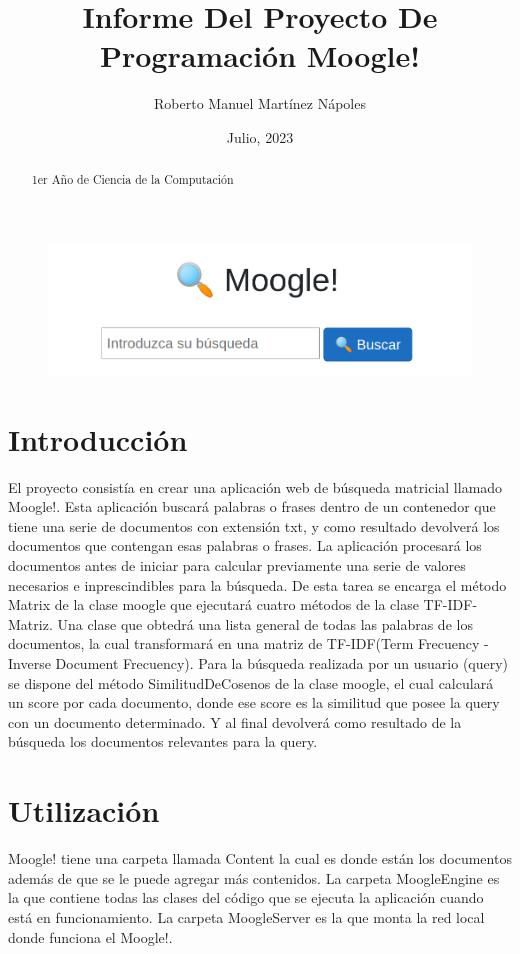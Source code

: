 \documentclass[spanish,10pt,a4paper]{article}
\begin{document}
	\title{Informe Del Proyecto De Programación Moogle!}
	\author{Roberto Manuel Martínez Nápoles}
	\date{Julio, 2023}
	\maketitle
	\begin{abstract}
		\center 
		1er Año de Ciencia de la Computación  
	\end{abstract}
	\begin{figure}[h]
	\center
	\includegraphics[width=12cm]{moogle.png}
	\end{figure}
	
	\newpage
	
	
	\section{Introducción}\label{sec:intro}
	El proyecto consistía en crear una aplicación web de búsqueda matricial llamado Moogle!.  Esta aplicación buscará palabras o frases dentro de un contenedor que tiene una serie de documentos con extensión txt, y como resultado devolverá los documentos que contengan esas palabras o frases. 
	La aplicación  procesará los documentos antes de iniciar para calcular previamente una serie de valores necesarios e inprescindibles para la búsqueda. De esta tarea se encarga el método Matrix  de la clase moogle que ejecutará cuatro métodos de la clase TF-IDF-Matriz. Una clase que obtedrá una lista general de todas las palabras de los documentos, la cual transformará en una matriz de TF-IDF(Term Frecuency - Inverse Document Frecuency).
	Para la búsqueda realizada por un usuario (query) se dispone del método SimilitudDeCosenos de la clase moogle, el cual calculará un score por cada documento, donde ese score es la similitud que posee la query con un documento determinado. Y al final devolverá como resultado de la búsqueda los documentos relevantes para la query.
	
	
	
	\newpage
	\section{Utilización}\label{sec:utilización}
	Moogle! tiene una carpeta llamada Content la cual es donde están los documentos además de que se le puede agregar más contenidos. La carpeta MoogleEngine es la que contiene todas las clases del código que se ejecuta la aplicación cuando  está en funcionamiento. La carpeta MoogleServer es la que monta la red local donde funciona el Moogle!.
	
\end{document}
